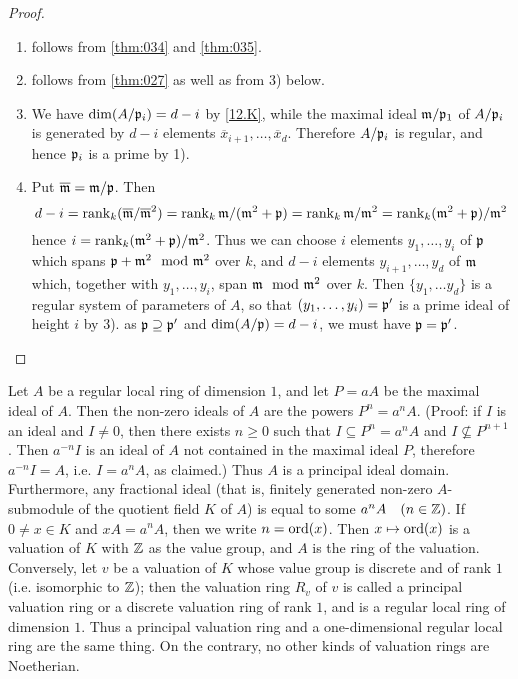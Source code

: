 \documentclass[../main]{subfiles}
\begin{document}
\begin{proof}
\begin{enumerate}[label=(\arabic*)]
    \item follows from \ref{thm:034} and \ref{thm:035}.
    
    \item follows from \ref{thm:027} as well as from 3) below.
    
    \item We have $\operatorname{dim}(A / \mathfrak{p}_i)=d-i$ by \ref{12.K}, while the maximal ideal $\mathfrak{m}/ \mathfrak{p}_1$ of $A/ \mathfrak{p}_i$ is generated by $d-i$ elements $\overline{x}_{i+1}, \dots, \overline{x}_d$. Therefore $A/\mathfrak{p}_i$ is regular, and hence $\mathfrak{p}_i$ is a prime by 1).
    
    \item Put $\overline{\mathfrak{m}}=\mathfrak{m} / \mathfrak{p}$. Then \[d-i=\operatorname{rank}_k(\overline{\mathfrak{m}}/\overline{\mathfrak{m}}^2) = \operatorname{rank}_k \mathfrak{m}/(\mathfrak{m}^2+\mathfrak{p}) = \operatorname{rank}_k \mathfrak{m}/\mathfrak{m}^2 = \operatorname{rank}_k (\mathfrak{m}^2+\mathfrak{p})/\mathfrak{m}^2\] hence $i=\operatorname{rank}_k (\mathfrak{m}^2+\mathfrak{p})/\mathfrak{m}^2$. Thus we can choose $i$ elements $y_1,\dots, y_i$ of $\mathfrak{p}$ which spans $\ideal{p}+\ideal{m}^2 \mod \ideal{m}^2$ over $k$, and $d-i$ elements $y_{i+1},\dots , y_d$ of $\mathfrak{m}$ which, together with $y_1,\dots,y_i$, span $\ideal{m}\mod \ideal{m}^2$ over $k$. Then $\{y_1,\dots y_d\}$ is a regular system of parameters of $A$, so that $(y_1,\dots,y_i) =\mathfrak{p}'$ is a prime ideal of height $i$ by 3). as $\mathfrak{p}\supseteq \mathfrak{p}'$ and $\operatorname{dim}(A/\mathfrak{p})=d-i$, we must have $\mathfrak{p}=\mathfrak{p}'$.
\end{enumerate}
\end{proof}

\newparagraph Let $A$ be a regular local ring of dimension $1$, and let $P= aA$ be the maximal ideal of $A$. Then the non-zero ideals of $A$ are the powers $P^n=a^nA$. (Proof: if $I$ is an ideal and $I \neq 0$, then there exists $n \geqslant 0$ such that $I \subseteq P^n=a^n A$ and $I \nsubseteq P^{n+1}$. Then $a^{-n} I$ is an ideal of $A$ not contained in the maximal ideal $P$, therefore $a^{-n} I=A$, i.e. $I=a^n A$, as claimed.) Thus $A$ is a principal ideal domain. Furthermore, any fractional ideal (that is, finitely generated non-zero $A$-submodule of the quotient field $K$ of $A$) is equal to some $a^n A\for{n\in\bZ}$. If $0 \neq x \in K$ and $x A=a^n A$, then we write $n=\operatorname{ord}(x)$. Then $x \mapsto \operatorname{ord}(x)$ is a valuation of $K$ with $\mathbb{Z}$ as the value group, and $A$ is the ring of the valuation. Conversely, let $v$ be a valuation of $K$ whose value group is discrete and of rank $1$ (i.e. isomorphic to $\mathbb{Z}$); then the valuation ring $R_v$ of $v$ is called a principal valuation ring or a discrete valuation ring of rank $1$, and is a regular local ring of dimension $1$. Thus a principal valuation ring and a one-dimensional regular local ring are the same thing. On the contrary, no other kinds of valuation rings are Noetherian.
\end{document}
